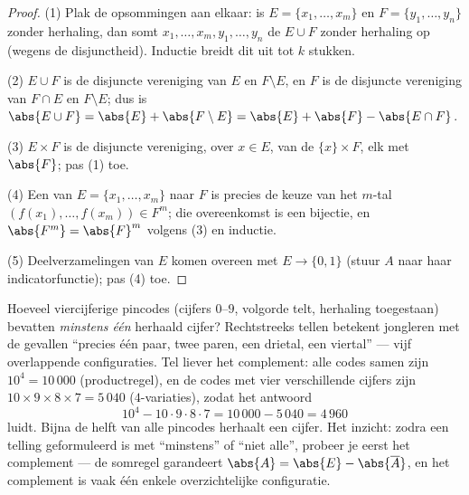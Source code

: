 \begin{proof}
(1) Plak de opsommingen aan elkaar: is $E = \{x_1, \dots, x_m\}$ en $F =
\{y_1, \dots, y_n\}$ zonder herhaling, dan somt $x_1, \dots, x_m, y_1,
\dots, y_n$ de  $E \cup F$ zonder herhaling op (wegens de
disjunctheid). Inductie breidt dit uit tot $k$ stukken.

(2) $E \cup F$ is de disjuncte vereniging van $E$ en $F \setminus E$, en
$F$ is de disjuncte vereniging van $F \cap E$ en $F \setminus E$; dus is
$\abs{E \cup F} = \abs{E} + \abs{F \setminus E} = \abs{E} + \abs{F} -
\abs{E \cap F}$.

(3) $E \times F$ is de disjuncte vereniging, over $x \in E$, van de
 $\{x\} \times F$, elk met  $\abs{F}$; pas (1)
toe.

(4) Een  van $E = \{x_1, \dots, x_m\}$ naar $F$ is precies de
keuze van het $m$-tal $(f(x_1), \dots, f(x_m)) \in F^m$; die
overeenkomst is een bijectie, en $\abs{F^m} = \abs{F}^m$ volgens (3) en
inductie.

(5) Deelverzamelingen van $E$ komen  overeen met  $E
\to \{0, 1\}$ (stuur $A$ naar haar indicatorfunctie); pas (4) toe.
\end{proof}

\begin{example}\label{ex:b1:counting:complement}
Hoeveel viercijferige pincodes (cijfers $0$--$9$, volgorde telt,
herhaling toegestaan) bevatten \emph{minstens één} herhaald cijfer?
Rechtstreeks tellen betekent jongleren met de gevallen ``precies
één paar, twee paren, een drietal, een viertal'' --- vijf
overlappende configuraties. Tel liever het complement: alle codes
samen zijn $10^4 = 10\,000$ (productregel), en de codes met vier
verschillende cijfers zijn $10 \times 9 \times 8 \times 7 =
5\,040$ ($4$-variaties), zodat het antwoord
\[
10^4 - 10 \cdot 9 \cdot 8 \cdot 7 = 10\,000 - 5\,040 = 4\,960
\]
luidt. Bijna de helft van alle pincodes herhaalt een cijfer. Het
inzicht: zodra een telling geformuleerd is met ``minstens'' of
``niet alle'', probeer je eerst het complement --- de somregel
garandeert $\abs{A} = \abs{E} - \abs{\overline A}$, en het
complement is vaak één enkele overzichtelijke configuratie.
\end{example}

